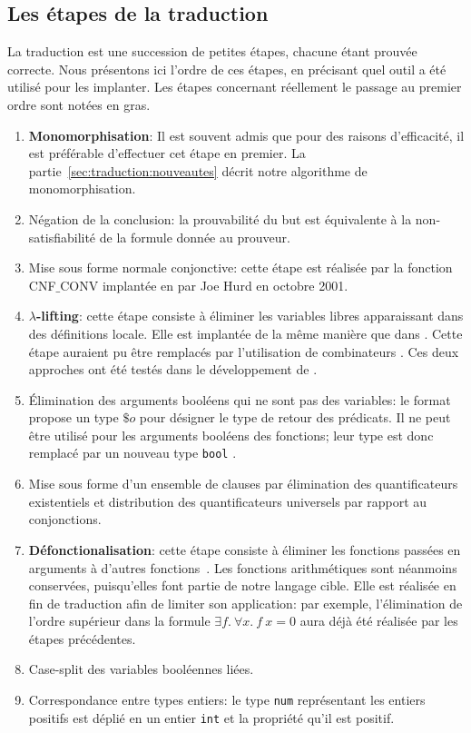 \subsection{Les étapes de la traduction}
La traduction est une succession de petites étapes, chacune étant
prouvée correcte. Nous présentons ici l'ordre de ces étapes, en
précisant quel outil a été utilisé pour les implanter. Les étapes
concernant réellement le passage au premier ordre sont notées en gras.
\begin{enumerate}
\item \textbf{Monomorphisation}: Il est souvent admis que pour des raisons d'efficacité, il est préférable d'effectuer cet étape en premier. La
  partie~\ref{sec:traduction:nouveautes} décrit notre algorithme de
  monomorphisation.
  \item Négation de la conclusion: la prouvabilité du but est
    équivalente à la non-satisfiabilité de la formule donnée au
    prouveur.
  \item Mise sous forme normale conjonctive: cette étape est réalisée
    par la fonction \textsf{CNF$\_$CONV} implantée en \holfour par Joe
    Hurd en octobre 2001.
  \item \textbf{$\lambda$-lifting}: cette étape consiste à éliminer les
    variables libres apparaissant dans des définitions locale. Elle est
    implantée de la même manière que dans \cite{Bohme12}. Cette étape
    auraient pu être remplacés par l'utilisation de combinateurs
    \cite{Hurd03}. Ces deux approches ont été testés dans le
    développement de \sledgehammer \cite{MengP08}.
  \item Élimination des arguments booléens qui ne sont pas des
    variables: le format \tff propose un type $\$o$ pour désigner le
    type de retour des prédicats. Il ne peut être utilisé pour les
    arguments booléens des fonctions; leur type est donc remplacé par un
    nouveau type \verb!bool! \cite{MengP08}.
  \item Mise sous forme d'un ensemble de clauses par élimination  des quantificateurs existentiels et distribution des quantificateurs universels par rapport au conjonctions.
  \item \textbf{Défonctionalisation}: cette étape consiste à éliminer
    les fonctions passées en arguments à d'autres
    fonctions~\cite{Hurd03,MengP08}.
    Les fonctions arithmétiques sont néanmoins conservées, puisqu'elles
    font partie de notre langage cible. Elle est réalisée en fin de
    traduction afin de limiter son application: par exemple,
    l'élimination de l'ordre supérieur dans la formule $\exists f.\
    \forall x.\ f\ x = 0$ aura déjà été réalisée par les étapes
    précédentes.
  \item Case-split des variables booléennes liées.
  \item Correspondance entre types entiers: le type \holfour \verb!num!
    représentant les entiers positifs est déplié en un entier \verb!int!
    et la propriété qu'il est positif.
\end{enumerate}

